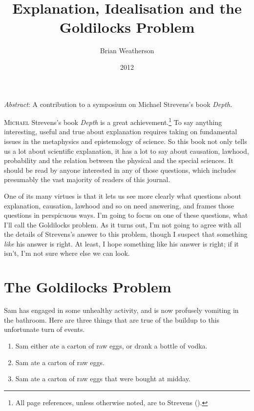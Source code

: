 \documentclass[
  11pt,
  letterpaper,
  DIV=11,
  numbers=noendperiod,
  twoside]{scrartcl}
\title{Explanation, Idealisation and the Goldilocks Problem}
\author{Brian Weatherson}
\date{2012}
\providecommand{\tightlist}{%
  \setlength{\itemsep}{0pt}\setlength{\parskip}{0pt}}
\renewenvironment{abstract}
 {\vspace{-1.25cm}
 \quotation\small\noindent\emph{Abstract}:}
 {\endquotation}
\renewenvironment{abstract}
 {\quotation\small\noindent\emph{Abstract}:}
 {\endquotation\vspace{-0.02cm}}
\begin{document}
\maketitle
\begin{abstract}
A contribution to a symposium on Michael Strevens's book \emph{Depth}.
\end{abstract}


\lettrine{M}{ichael} Strevens's book \emph{Depth} is a great
achievement.\footnote{All page references, unless otherwise noted, are
  to Strevens ().} To say anything
interesting, useful and true about explanation requires taking on
fundamental issues in the metaphysics and epistemology of science. So
this book not only tells us a lot about scientific explanation, it has a
lot to say about causation, lawhood, probability and the relation
between the physical and the special sciences. It should be read by
anyone interested in any of those questions, which includes presumably
the vast majority of readers of this journal.

One of its many virtues is that it lets us see more clearly what
questions about explanation, causation, lawhood and so on need
answering, and frames those questions in perspicuous ways. I'm going to
focus on one of these questions, what I'll call the Goldilocks problem.
As it turns out, I'm not going to agree with all the details of
Strevens's answer to this problem, though I suspect that something
\emph{like} his answer is right. At least, I hope something like his
answer is right; if it isn't, I'm not sure where else we can look.

\section{The Goldilocks Problem}\label{the-goldilocks-problem}

Sam has engaged in some unhealthy activity, and is now profusely
vomiting in the bathroom. Here are three things that are true of the
buildup to this unfortunate turn of events.

\begin{enumerate}
\def\labelenumi{\arabic{enumi}.}
\tightlist
\item
  Sam either ate a carton of raw eggs, or drank a bottle of vodka.
\item
  Sam ate a carton of raw eggs.
\item
  Sam ate a carton of raw eggs that were bought at midday.
\end{enumerate}
\end{document}
